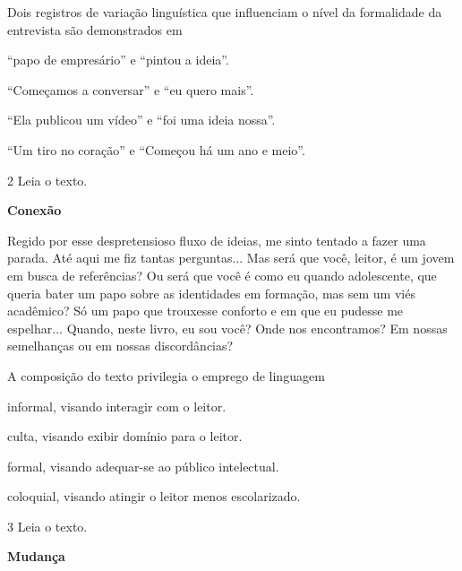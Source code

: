 Dois registros de variação linguística que influenciam o nível da formalidade da entrevista são demonstrados em

\begin{escolha}
\item ``papo de empresário'' e ``pintou a ideia''.

\item ``Começamos a conversar'' e ``eu quero mais''.

\item ``Ela publicou um vídeo'' e ``foi uma ideia nossa''.

\item ``Um tiro no coração'' e ``Começou há um ano e meio''.
\end{escolha}

\num{2} Leia o texto.

\centering\textbf{Conexão}


\begin{myquote}
Regido por esse despretensioso fluxo de ideias, me sinto tentado a fazer
uma parada. Até aqui me fiz tantas perguntas... Mas será que você,
leitor, é um jovem em busca de referências? Ou será que você é como eu
quando adolescente, que queria bater um papo sobre as identidades em
formação, mas sem um viés acadêmico? Só um papo que trouxesse conforto e
em que eu pudesse me espelhar... Quando, neste livro, eu sou você? Onde
nos encontramos? Em nossas semelhanças ou em nossas discordâncias?
\end{myquote}

A composição do texto privilegia o emprego de linguagem

\begin{escolha}
\item informal, visando interagir com o leitor.

\item culta, visando exibir domínio para o leitor.

\item formal, visando adequar-se ao público intelectual.

\item coloquial, visando atingir o leitor menos escolarizado.
\end{escolha}

\num{3} Leia o texto.

\centering\textbf{Mudança}


